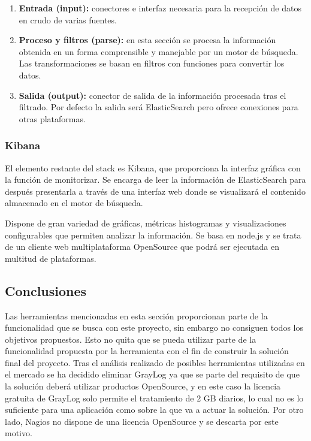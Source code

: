 \begin{enumerate}
\item \textbf{Entrada (input):} conectores e interfaz necesaria para la recepción de datos en crudo de varias fuentes.
\item \textbf{Proceso y filtros (parse):} en esta sección se procesa la información obtenida en un forma comprensible y manejable por un motor de búsqueda. Las transformaciones se basan en filtros con funciones para convertir los datos.
\item \textbf{Salida (output):} conector de salida de la información procesada tras el filtrado. Por defecto la salida será ElasticSearch pero ofrece conexiones para otras plataformas.
\end{enumerate}

\subsubsection{Kibana}

El elemento restante del stack es Kibana, que proporciona la interfaz gráfica con la función de monitorizar. Se encarga de leer la información de ElasticSearch para después presentarla a través de una interfaz web donde se visualizará el contenido almacenado en el motor de búsqueda.

Dispone de gran variedad de gráficas, métricas histogramas y visualizaciones configurables que permiten analizar la información. Se basa en node.js y se trata de un cliente web multiplataforma OpenSource que podrá ser ejecutada en multitud de plataformas.


\subsection{Conclusiones}

Las herramientas mencionadas en esta sección proporcionan parte de la funcionalidad que se busca con este proyecto, sin embargo no consiguen todos los objetivos propuestos. Esto no quita que se pueda utilizar parte de la funcionalidad propuesta por la herramienta con el fin de construir la solución final del proyecto. Tras el análisis realizado de posibles herramientas utilizadas en el mercado se ha decidido eliminar GrayLog ya que se parte del requisito de que la solución deberá utilizar productos OpenSource, y en este caso la licencia gratuita de GrayLog solo permite el tratamiento de 2 GB diarios, lo cual no es lo suficiente para una aplicación como sobre la que va a actuar la solución. Por otro lado, Nagios no dispone de una licencia OpenSource y se descarta por este motivo.

